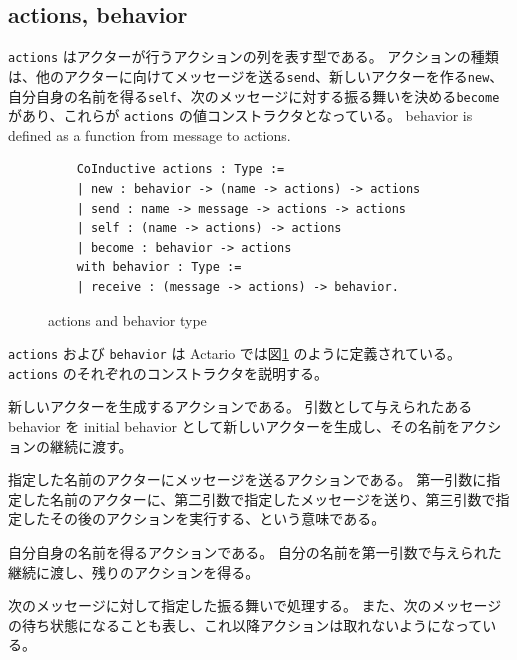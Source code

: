 \subsection{actions, behavior}
\texttt{actions} はアクターが行うアクションの列を表す型である。
アクションの種類は、他のアクターに向けてメッセージを送る\texttt{send}、新しいアクターを作る\texttt{new}、自分自身の名前を得る\texttt{self}、次のメッセージに対する振る舞いを決める\texttt{become}があり、これらが \texttt{actions} の値コンストラクタとなっている。
behavior is defined as a function from message to actions.

\begin{figure}[tb]
  \begin{lstlisting}
    CoInductive actions : Type :=
    | new : behavior -> (name -> actions) -> actions
    | send : name -> message -> actions -> actions
    | self : (name -> actions) -> actions
    | become : behavior -> actions
    with behavior : Type :=
    | receive : (message -> actions) -> behavior.
  \end{lstlisting}
  \caption{actions and behavior type}\label{coq:actions}
\end{figure}

\texttt{actions} および \texttt{behavior} は Actario では図\ref{coq:actions} のように定義されている。
\texttt{actions} のそれぞれのコンストラクタを説明する。
\begin{description}[style=nextline,leftmargin=12pt,parsep=0pt]
\item[\texttt{new : behavior -> (name -> actions) -> actions}]
  新しいアクターを生成するアクションである。
  引数として与えられたある behavior を initial behavior として新しいアクターを生成し、その名前をアクションの継続に渡す。
\item[\texttt{send : name -> message -> actions -> actions}]
  指定した名前のアクターにメッセージを送るアクションである。
  第一引数に指定した名前のアクターに、第二引数で指定したメッセージを送り、第三引数で指定したその後のアクションを実行する、という意味である。
\item[\texttt{self : (name -> actions) -> actions}]
  自分自身の名前を得るアクションである。
  自分の名前を第一引数で与えられた継続に渡し、残りのアクションを得る。
\item[\texttt{become : behavior -> actions}]
  次のメッセージに対して指定した振る舞いで処理する。
  また、次のメッセージの待ち状態になることも表し、これ以降アクションは取れないようになっている。
\end{description}

